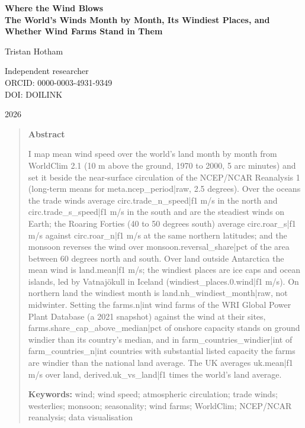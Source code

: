 \documentclass[11pt,a4paper]{article}
\begin{document}
\begin{center}
{\Large\bfseries Where the Wind Blows\\[2pt] The World's Winds Month by Month, Its Windiest Places, and Whether Wind Farms Stand in Them\par}
\vspace{1.2em}
{\large Tristan Hotham\par}
\vspace{0.3em}
{\small Independent researcher\\
ORCID: 0000-0003-4931-9349\\
DOI: {{DOILINK}}\par}
\vspace{0.8em}
2026
\end{center}

\begin{quote}
\small
\begin{center}\textbf{Abstract}\end{center}
I map mean wind speed over the world's land month by month from WorldClim 2.1 (10 m above the ground, 1970 to 2000, 5 arc minutes) and set it beside the near-surface circulation of the NCEP/NCAR Reanalysis 1 (long-term means for {{meta.ncep_period|raw}}, 2.5 degrees). Over the oceans the trade winds average {{circ.trade_n_speed|f1}} m/s in the north and {{circ.trade_s_speed|f1}} m/s in the south and are the steadiest winds on Earth; the Roaring Forties (40 to 50 degrees south) average {{circ.roar_s|f1}} m/s against {{circ.roar_n|f1}} m/s at the same northern latitudes; and the monsoon reverses the wind over {{monsoon.reversal_share|pct}} of the area between 60 degrees north and south. Over land outside Antarctica the mean wind is {{land.mean|f1}} m/s; the windiest places are ice caps and ocean islands, led by Vatnajökull in Iceland ({{windiest_places.0.wind|f1}} m/s). On northern land the windiest month is {{land.nh_windiest_month|raw}}, not midwinter. Setting the {{farms.n|int}} wind farms of the WRI Global Power Plant Database (a 2021 snapshot) against the wind at their sites, {{farms.share_cap_above_median|pct}} of onshore capacity stands on ground windier than its country's median, and in {{farm_countries_windier|int}} of {{farm_countries_n|int}} countries with substantial listed capacity the farms are windier than the national land average. The UK averages {{uk.mean|f1}} m/s over land, {{derived.uk_vs_land|f1}} times the world's land average.

\textbf{Keywords:} wind; wind speed; atmospheric circulation; trade winds; westerlies; monsoon; seasonality; wind farms; WorldClim; NCEP/NCAR reanalysis; data visualisation
\end{quote}
\end{document}
